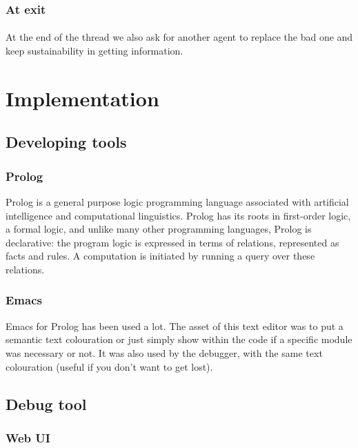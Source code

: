 \documentclass{article}
\begin{document}
	\subsubsection{At exit}
	\paragraph{}
	At the end of the thread we also ask for another agent to replace the bad one and keep sustainability in getting information.

\section{Implementation}
	\subsection{Developing tools}
	\subsubsection{Prolog}
		Prolog is a general purpose logic programming language associated with artificial intelligence and computational linguistics.
		Prolog has its roots in first-order logic, a formal logic, and unlike many other programming languages,
		Prolog is declarative: the program logic is expressed in terms of relations, represented as facts and rules.
		A computation is initiated by running a query over these relations.
	\subsubsection{Emacs}
	Emacs for Prolog has been used a lot.
	The asset of this text editor was to put a semantic text colouration
	or just simply show within the code if a specific module was necessary or not.
	It was also used by the debugger, with the same text colouration (useful if you don't want to get lost).
	\subsection{Debug tool}
	\subsubsection{Web UI}
\end{document}
